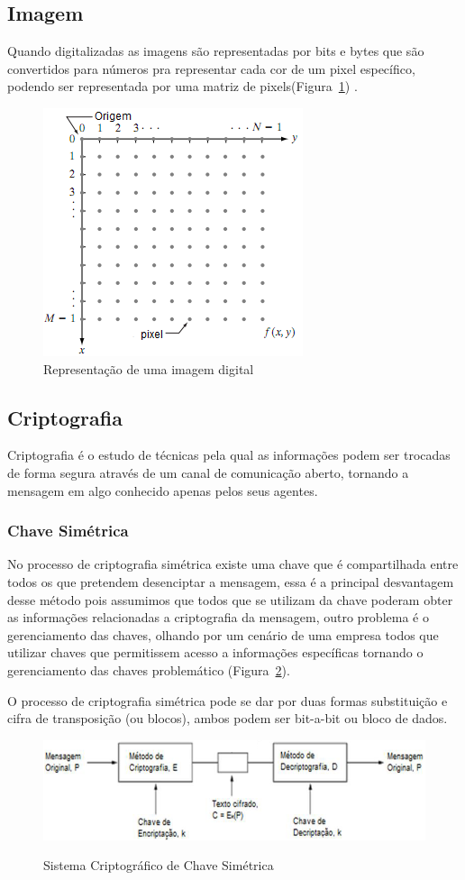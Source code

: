 \documentclass[12pt]{article}
\begin{document}
\subsection{Imagem}
Quando digitalizadas as imagens são representadas por bits e bytes que são convertidos para números pra representar cada cor de um pixel específico, podendo ser representada por uma matriz de pixels(Figura~\ref{fig:repImage}) .  

\begin{figure}[ht]
\centering
\includegraphics[width=.3\textwidth]{images/image.png}
\caption{Representação de uma imagem digital}
\label{fig:repImage}
\end{figure}

\subsection{Criptografia}
Criptografia é o estudo de técnicas pela qual as informações podem ser trocadas de forma segura através de um canal de comunicação aberto, tornando a mensagem em algo conhecido apenas pelos seus agentes.
\subsubsection{Chave Simétrica}
No processo de criptografia simétrica existe uma chave que é compartilhada entre todos os que pretendem desenciptar a mensagem, essa é a principal desvantagem desse método pois assumimos que todos que se utilizam da chave poderam obter as informações relacionadas a criptografia da mensagem, outro problema é o gerenciamento das chaves, olhando por um cenário de uma empresa todos que utilizar chaves que permitissem acesso a informações específicas tornando o gerenciamento das chaves problemático (Figura~\ref{fig:simProc}).


O processo de criptografia simétrica pode se dar por duas formas substituição e cifra de transposição (ou blocos), ambos podem ser bit-a-bit ou bloco de dados.

\begin{figure}[ht]
\centering
\includegraphics[width=.7\textwidth]{images/process_sim.png}
\caption{Sistema Criptográfico de Chave Simétrica} \cite{mikhail:2010}
\label{fig:simProc}
\end{figure}
\end{document}
